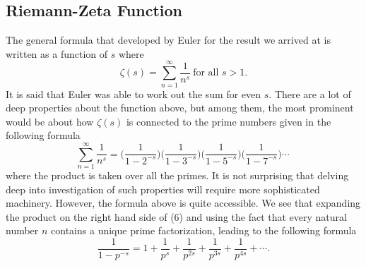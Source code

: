 \subsection{Riemann-Zeta Function}

The general formula that developed by Euler for the result we arrived at is written as a function of \( s  \) where 
\[  \zeta(s) = \sum_{ n= 1  }^{ \infty  } \frac{ 1 }{  n^{s}   }  \ \text{for all  }   s > 1. \] It is said that Euler was able to work out the sum for even \( s  \). There are a lot of deep properties about the function above, but among them, the most prominent would be about how \( \zeta(s) \) is connected to the prime numbers given in the following formula 
\[  \sum_{ n=1  }^{ \infty  } \frac{ 1 }{ n^{s}  } =   \Big( \frac{ 1 }{ 1 - 2^{-s }   }  \Big) \Big( \frac{ 1 }{  1 - 3^{-s} }  \Big) \Big( \frac{ 1  }{  1 - 5^{-s} }   \Big) \Big( \frac{ 1 }{  1- 7^{-s } }   \Big) \dotsb \  \tag{6} \] where the product is taken over all the primes. It is not surprising that delving deep into investigation of such properties will require more sophisticated machinery. However, the formula above is quite accessible. 
 We see that expanding the product on the right hand side of (6) and using the fact that every natural number \( n  \) contains a unique prime factorization, leading to the following formula 
\[  \frac{ 1 }{  1 - p^{-s} } = 1 + \frac{ 1  }{  p^{s}  }  + \frac{ 1 }{ p^{2s} } + \frac{ 1 }{  p^{3s} } + \frac{ 1 }{  p^{4s} } + \dotsb .  \]





